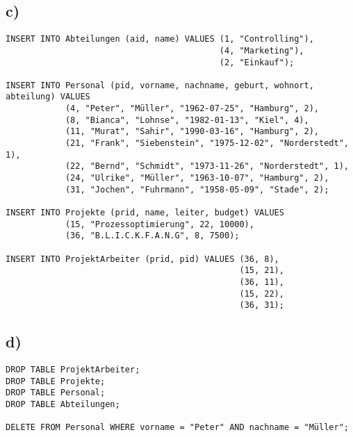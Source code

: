 \documentclass[a4paper,10pt,]{scrartcl}
\begin{document}
\subsection*{c)}
\begin{verbatim}
INSERT INTO Abteilungen (aid, name) VALUES (1, "Controlling"),
                                           (4, "Marketing"),
                                           (2, "Einkauf");

INSERT INTO Personal (pid, vorname, nachname, geburt, wohnort, abteilung) VALUES
            (4, "Peter", "Müller", "1962-07-25", "Hamburg", 2),
            (8, "Bianca", "Lohnse", "1982-01-13", "Kiel", 4),
            (11, "Murat", "Sahir", "1990-03-16", "Hamburg", 2),
            (21, "Frank", "Siebenstein", "1975-12-02", "Norderstedt", 1),
            (22, "Bernd", "Schmidt", "1973-11-26", "Norderstedt", 1),
            (24, "Ulrike", "Müller", "1963-10-07", "Hamburg", 2),
            (31, "Jochen", "Fuhrmann", "1958-05-09", "Stade", 2);

INSERT INTO Projekte (prid, name, leiter, budget) VALUES
            (15, "Prozessoptimierung", 22, 10000),
            (36, "B.L.I.C.K.F.A.N.G", 8, 7500);

INSERT INTO ProjektArbeiter (prid, pid) VALUES (36, 8),
                                               (15, 21),
                                               (36, 11),
                                               (15, 22),
                                               (36, 31);
\end{verbatim}

\newpage
\subsection*{d)}
\begin{verbatim}
DROP TABLE ProjektArbeiter;
DROP TABLE Projekte;
DROP TABLE Personal;
DROP TABLE Abteilungen;

DELETE FROM Personal WHERE vorname = "Peter" AND nachname = "Müller";
\end{verbatim}
\end{document}
